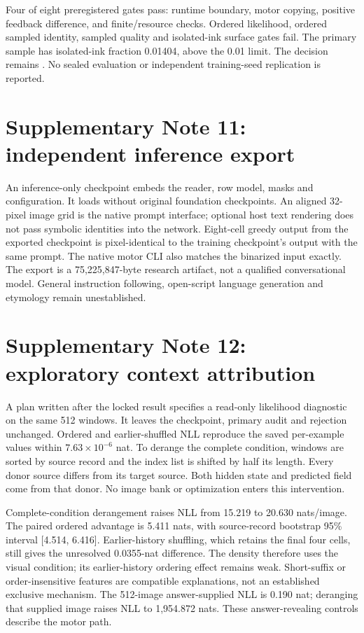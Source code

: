 \documentclass[10pt,a4paper]{article}
\begin{document}
Four of eight preregistered gates pass: runtime boundary, motor copying,
positive feedback difference, and finite/resource checks. Ordered likelihood,
ordered sampled identity, sampled quality and isolated-ink surface gates fail.
The primary sample has isolated-ink fraction 0.01404, above the 0.01 limit.
The decision remains \texttt{\DensityDecision}. No sealed evaluation or
independent training-seed replication is reported.

\section*{Supplementary Note 11: independent inference export}
An inference-only checkpoint embeds the reader, row model, masks and
configuration. It loads without original foundation checkpoints. An aligned
32-pixel image grid is the native prompt interface; optional host text rendering
does not pass symbolic identities into the network. Eight-cell greedy output
from the exported checkpoint is pixel-identical to the training checkpoint's
output with the same prompt. The native motor CLI also matches the binarized
input exactly. The export is a 75,225,847-byte research artifact, not a
qualified conversational model. General instruction following, open-script
language generation and etymology remain unestablished.

\section*{Supplementary Note 12: exploratory context attribution}
A plan written after the locked result specifies a read-only likelihood
diagnostic on the same 512 windows. It leaves the checkpoint, primary audit
and rejection unchanged. Ordered and earlier-shuffled NLL reproduce the saved
per-example values within $7.63\times10^{-6}$ nat. To derange the complete
condition, windows are sorted by source record and the index list is shifted
by half its length. Every donor source differs from its target source. Both
hidden state and predicted field come from that donor. No image bank or
optimization enters this intervention.

Complete-condition derangement raises NLL from 15.219 to 20.630 nats/image.
The paired ordered advantage is 5.411 nats, with source-record bootstrap
95\% interval [4.514, 6.416]. Earlier-history shuffling, which retains the
final four cells, still gives the unresolved 0.0355-nat difference. The density
therefore uses the visual condition; its earlier-history ordering effect
remains weak. Short-suffix or order-insensitive features are compatible
explanations, not an established exclusive mechanism. The 512-image
answer-supplied NLL is 0.190 nat; deranging that supplied image raises NLL to
1,954.872 nats. These answer-revealing controls describe the motor path.
\end{document}
